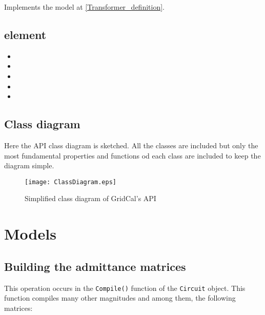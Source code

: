 \documentclass[11pt,fleqn]{book} %
\begin{document}
Implements the model at \ref{Transformer_definition}.





\section{element}

\begin{itemize}
	\item 
	\item 
	\item 
	\item 
	\item 
\end{itemize}


\section{Class diagram}

Here the API class diagram is sketched. All the classes are included but only the most fundamental properties and functions od each class are included to keep the diagram simple.

\begin{figure}[h]
	\centering
	\texttt{[image: ClassDiagram.eps]}
	\caption{Simplified class diagram of GridCal's API}
	\label{fig:ClassDiagram}
\end{figure}


\chapter{Models}



\section{Building the admittance matrices} \label{admitances_section}

This operation occurs in the \verb|Compile()| function of the \verb|Circuit| object. This function compiles many other magnitudes and among them, the following matrices:
\end{document}
